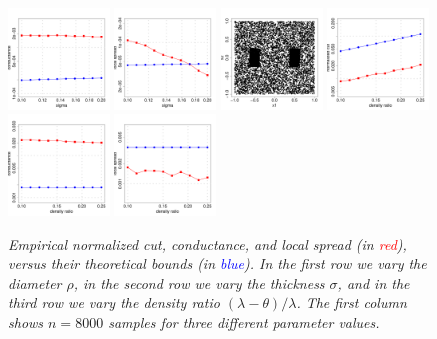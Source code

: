 \documentclass[11pt,twoside]{article}
\newcommand{\1}{\mathbf{1}}
\begin{document}
\begin{figure}[htb]
	\includegraphics[width=0.24\textwidth]{plots/experiment_1/sigma/conductance.pdf}
	\includegraphics[width=0.24\textwidth]{plots/experiment_1/sigma/local_spread.pdf}
	\includegraphics[width=0.24\textwidth]{plots/experiment_1/density_ratio/samples3.pdf}
	\includegraphics[width=0.24\textwidth]{plots/experiment_1/density_ratio/normalized_cut.pdf}
	\includegraphics[width=0.24\textwidth]{plots/experiment_1/density_ratio/conductance.pdf}
	\includegraphics[width=0.24\textwidth]{plots/experiment_1/density_ratio/local_spread.pdf}
	\caption{\it \small Empirical normalized cut, conductance, and local spread (in \textcolor{red}{red}), versus their theoretical bounds (in \textcolor{blue}{blue}). In the first row we vary the diameter $\rho$, in the second row we vary the thickness $\sigma$, and in the third row we vary the density ratio $(\lambda - \theta)/\lambda$. The first column shows $n = 8000$ samples for three different parameter values.}
	\label{fig:bounds}
\end{figure}
\end{document}
